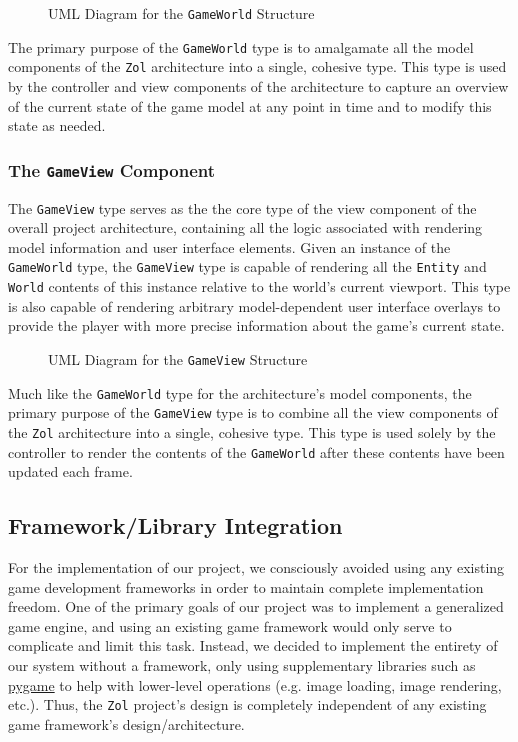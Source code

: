 \documentclass{article}
\newcommand{\classname}[1] {\texttt{#1}}
\newcommand{\projectname}[0] {\texttt{Zol} }
\newcommand{\insertdiagram}[2]
{
	\begin{figure}[H]
		\centering
		\fbox{\texttt{[image: figures/\#1]}}
		\caption{UML Diagram for the \classname{#1} Structure}
	\end{figure}
}
\begin{document}
			\insertdiagram{GameWorld}{3.0in}

			The primary purpose of the \classname{GameWorld} type is to amalgamate
			all the model components of the \projectname architecture into a
			single, cohesive type.  This type is used by the controller and view
			components of the architecture to capture an overview of the current
			state of the game model at any point in time and to modify this state
			as needed.

			\subsubsection[\classname{GameView}]{The \classname{GameView} Component}
			The \classname{GameView} type serves as the the core type of the 
			view component of the overall project architecture, containing all
			the logic associated with rendering model information and user
			interface elements.  Given an instance of the \classname{GameWorld}
			type, the \classname{GameView} type is capable of rendering all
			the \classname{Entity} and \classname{World} contents of this
			instance relative to the world's current viewport.  This type
			is also capable of rendering arbitrary model-dependent user 
			interface overlays to provide the player with more precise
			information about the game's current state.

			\insertdiagram{GameView}{2.0in}

			Much like the \classname{GameWorld} type for the architecture's
			model components, the primary purpose of the \classname{GameView} 
			type is to combine all the view components of the \projectname architecture 
			into a single, cohesive type.  This type is used solely by the controller
			to render the contents of the \classname{GameWorld} after these
			contents have been updated each frame.

		\subsection{Framework/Library Integration}
		For the implementation of our project, we consciously avoided using any
		existing game development frameworks in order to maintain complete
		implementation freedom.  One of the primary goals of our project was
		to implement a generalized game engine, and using an existing game
		framework would only serve to complicate and limit this task.  Instead, 
		we decided to implement the entirety of our system without a framework, 
		only using supplementary libraries such as 
		\href{http://www.pygame.org/news.html}{pygame} to help with lower-level 
		operations (e.g. image loading, image rendering, etc.).  Thus, the
		\projectname project's design is completely independent of any existing 
		game framework's design/architecture.
\end{document}
